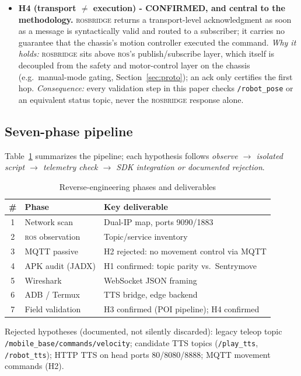\documentclass[conference]{IEEEtran}
\newcommand{\ros}{\textsc{ros}}
\newcommand{\rosbridge}{\textsc{rosbridge}}
\begin{document}
\begin{itemize}[leftmargin=1em]
\item \textbf{H4 (transport $\neq$ execution) - CONFIRMED, and central to the methodology.} \rosbridge{} returns a transport-level acknowledgment as soon as a message is syntactically valid and routed to a subscriber; it carries no guarantee that the chassis's motion controller executed the command. \emph{Why it holds:} \rosbridge{} sits above \ros{}'s publish/subscribe layer, which itself is decoupled from the safety and motor-control layer on the chassis (e.g.\ manual-mode gating, Section~\ref{sec:proto}); an ack only certifies the first hop. \emph{Consequence:} every validation step in this paper checks \texttt{/robot\_pose} or an equivalent status topic, never the \rosbridge{} response alone.
\end{itemize}

\subsection{Seven-phase pipeline}

Table~\ref{tab:re-phases} summarizes the pipeline; each hypothesis follows \emph{observe $\rightarrow$ isolated script $\rightarrow$ telemetry check $\rightarrow$ SDK integration or documented rejection}.

\begin{table}[!t]
\caption{Reverse-engineering phases and deliverables}
\label{tab:re-phases}
\centering
\scriptsize
\begin{tabular}{@{}clp{3.3cm}@{}}
\toprule
\textbf{\#} & \textbf{Phase} & \textbf{Key deliverable} \\
\midrule
1 & Network scan & Dual-IP map, ports 9090/1883 \\
2 & \ros{} observation & Topic/service inventory \\
3 & MQTT passive & H2 rejected: no movement control via MQTT \\
4 & APK audit (JADX) & H1 confirmed: topic parity vs.\ Sentrymove \\
5 & Wireshark & WebSocket JSON framing \\
6 & ADB / Termux & TTS bridge, edge backend \\
7 & Field validation & H3 confirmed (POI pipeline); H4 confirmed \\
\bottomrule
\end{tabular}
\end{table}

Rejected hypotheses (documented, not silently discarded): legacy teleop topic \texttt{/mobile\_base/commands/velocity}; candidate TTS topics (\texttt{/play\_tts}, \texttt{/robot\_tts}); HTTP TTS on head ports 80/8080/8888; MQTT movement commands (H2).
\end{document}
